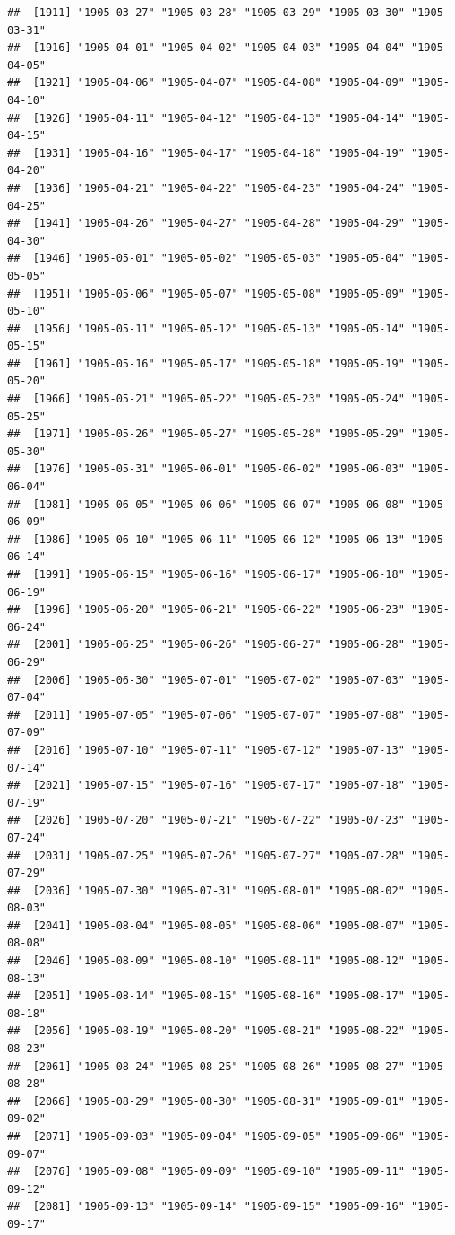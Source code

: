 \documentclass{article}\usepackage[]{graphicx}\usepackage[]{color}
\makeatletter
\newenvironment{kframe}{%
 \def\at@end@of@kframe{}%
 \ifinner\ifhmode%
  \def\at@end@of@kframe{\end{minipage}}%
  \begin{minipage}{\columnwidth}%
 \fi\fi%
 \def\FrameCommand##1{\hskip\@totalleftmargin \hskip-\fboxsep
 \colorbox{shadecolor}{##1}\hskip-\fboxsep
     \hskip-\linewidth \hskip-\@totalleftmargin \hskip\columnwidth}%
 \MakeFramed {\advance\hsize-\width
   \@totalleftmargin\z@ \linewidth\hsize
   \@setminipage}}%
 {\par\unskip\endMakeFramed%
 \at@end@of@kframe}
\newenvironment{knitrout}{}{} %
\makeatother
\begin{document}
\begin{description}
\begin{knitrout}
\begin{kframe}
\begin{verbatim}
##  [1911] "1905-03-27" "1905-03-28" "1905-03-29" "1905-03-30" "1905-03-31"
##  [1916] "1905-04-01" "1905-04-02" "1905-04-03" "1905-04-04" "1905-04-05"
##  [1921] "1905-04-06" "1905-04-07" "1905-04-08" "1905-04-09" "1905-04-10"
##  [1926] "1905-04-11" "1905-04-12" "1905-04-13" "1905-04-14" "1905-04-15"
##  [1931] "1905-04-16" "1905-04-17" "1905-04-18" "1905-04-19" "1905-04-20"
##  [1936] "1905-04-21" "1905-04-22" "1905-04-23" "1905-04-24" "1905-04-25"
##  [1941] "1905-04-26" "1905-04-27" "1905-04-28" "1905-04-29" "1905-04-30"
##  [1946] "1905-05-01" "1905-05-02" "1905-05-03" "1905-05-04" "1905-05-05"
##  [1951] "1905-05-06" "1905-05-07" "1905-05-08" "1905-05-09" "1905-05-10"
##  [1956] "1905-05-11" "1905-05-12" "1905-05-13" "1905-05-14" "1905-05-15"
##  [1961] "1905-05-16" "1905-05-17" "1905-05-18" "1905-05-19" "1905-05-20"
##  [1966] "1905-05-21" "1905-05-22" "1905-05-23" "1905-05-24" "1905-05-25"
##  [1971] "1905-05-26" "1905-05-27" "1905-05-28" "1905-05-29" "1905-05-30"
##  [1976] "1905-05-31" "1905-06-01" "1905-06-02" "1905-06-03" "1905-06-04"
##  [1981] "1905-06-05" "1905-06-06" "1905-06-07" "1905-06-08" "1905-06-09"
##  [1986] "1905-06-10" "1905-06-11" "1905-06-12" "1905-06-13" "1905-06-14"
##  [1991] "1905-06-15" "1905-06-16" "1905-06-17" "1905-06-18" "1905-06-19"
##  [1996] "1905-06-20" "1905-06-21" "1905-06-22" "1905-06-23" "1905-06-24"
##  [2001] "1905-06-25" "1905-06-26" "1905-06-27" "1905-06-28" "1905-06-29"
##  [2006] "1905-06-30" "1905-07-01" "1905-07-02" "1905-07-03" "1905-07-04"
##  [2011] "1905-07-05" "1905-07-06" "1905-07-07" "1905-07-08" "1905-07-09"
##  [2016] "1905-07-10" "1905-07-11" "1905-07-12" "1905-07-13" "1905-07-14"
##  [2021] "1905-07-15" "1905-07-16" "1905-07-17" "1905-07-18" "1905-07-19"
##  [2026] "1905-07-20" "1905-07-21" "1905-07-22" "1905-07-23" "1905-07-24"
##  [2031] "1905-07-25" "1905-07-26" "1905-07-27" "1905-07-28" "1905-07-29"
##  [2036] "1905-07-30" "1905-07-31" "1905-08-01" "1905-08-02" "1905-08-03"
##  [2041] "1905-08-04" "1905-08-05" "1905-08-06" "1905-08-07" "1905-08-08"
##  [2046] "1905-08-09" "1905-08-10" "1905-08-11" "1905-08-12" "1905-08-13"
##  [2051] "1905-08-14" "1905-08-15" "1905-08-16" "1905-08-17" "1905-08-18"
##  [2056] "1905-08-19" "1905-08-20" "1905-08-21" "1905-08-22" "1905-08-23"
##  [2061] "1905-08-24" "1905-08-25" "1905-08-26" "1905-08-27" "1905-08-28"
##  [2066] "1905-08-29" "1905-08-30" "1905-08-31" "1905-09-01" "1905-09-02"
##  [2071] "1905-09-03" "1905-09-04" "1905-09-05" "1905-09-06" "1905-09-07"
##  [2076] "1905-09-08" "1905-09-09" "1905-09-10" "1905-09-11" "1905-09-12"
##  [2081] "1905-09-13" "1905-09-14" "1905-09-15" "1905-09-16" "1905-09-17"

\end{verbatim}
\end{kframe}
\end{knitrout}
\end{description}
\end{document}
